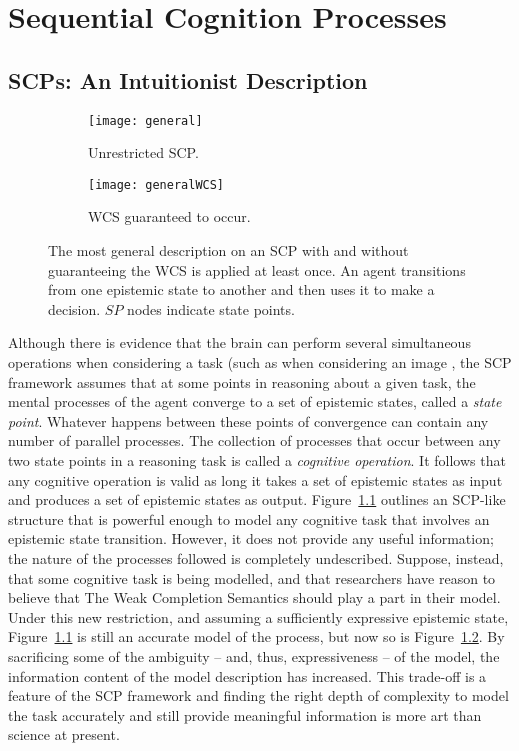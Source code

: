 \chapter{Sequential Cognition Processes} \label{chp:scp}
\section{SCPs: An Intuitionist Description} \label{ssec:intu}
\begin{figure*}
\begin{subfigure}{.35\textwidth}
  \centering
  \texttt{[image: general]}
  \caption{Unrestricted SCP.}
  \label{fig:scp_general}
\end{subfigure}%
\begin{subfigure}{.65\textwidth}
  \centering
  \texttt{[image: generalWCS]}
  \caption{WCS guaranteed to occur.}
  \label{fig:sfig2}
\end{subfigure}
\caption{The most general description on an SCP with and without guaranteeing the WCS is applied at least once. An agent transitions from one epistemic state to another and then uses it to make a decision. $SP$ nodes indicate state points.}
\label{fig:scp_generalWCS}
\end{figure*}

Although there is evidence that the brain can perform several simultaneous operations when considering a task (such as when considering an image \citep{sigman2008brain}, the SCP framework assumes that at some points in reasoning about a given task, the mental processes of the agent converge to a set of epistemic states, called a \textit{state point}. Whatever happens between these points of convergence can contain any number of parallel processes. The collection of processes that occur between any two state points in a reasoning task is called a \textit{cognitive operation}. It follows that any cognitive operation is valid as long it takes a set of epistemic states as input and produces a set of epistemic states as output. Figure~\ref{fig:scp_general} outlines an SCP-like structure that is powerful enough to model any cognitive task that involves an epistemic state transition. However, it does not provide any useful information; the nature of the processes followed is completely undescribed. Suppose, instead, that some cognitive task is being modelled, and that researchers have reason to believe that The Weak Completion Semantics should play a part in their model. Under this new restriction, and assuming a sufficiently expressive epistemic state, Figure~\ref{fig:scp_general} is still an accurate model of the process, but now so is Figure~\ref{fig:sfig2}. By sacrificing some of the ambiguity -- and, thus, expressiveness -- of the model, the information content of the model description has increased. This trade-off is a feature of the SCP framework and finding the right depth of complexity to model the task accurately and still provide meaningful information is more art than science at present. 

